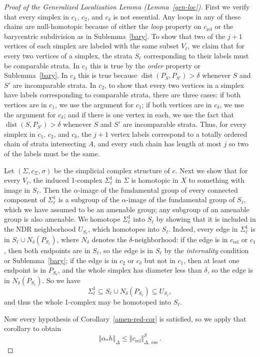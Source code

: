 \documentclass[psamsfonts]{amsart}
\theoremstyle{remark}
\DeclareMathOperator{\dist}{dist}
\DeclareMathOperator{\ess}{ess}
\DeclareMathOperator{\rel}{rel}
\begin{document}
\begin{proof}[Proof of the Generalized Localization Lemma (Lemma~\ref{gen-loc})]
First we verify that every simplex in $c_1$, $c_2$, and $c_\delta$ is not essential.  Any loops in any of these chains are null-homotopic because of either the \emph{loop} property on $c_{\rel}$ or the barycentric subdivision as in Sublemma~\ref{bary}.  To show that two of the $j+1$ vertices of each simplex are labeled with the same subset $V_\ell$, we claim that for every two vertices of a simplex, the strata $S_\ell$ corresponding to their labels must be comparable strata.  In $c_1$ this is true by the \emph{order} property or Sublemma~\ref{bary}.  In $c_\delta$ this is true because $\dist(P_S, P_{S'}) > \delta$ whenever $S$ and $S'$ are incomparable strata.  In $c_2$, to show that every two vertices in a simplex have labels corresponding to comparable strata, there are three cases: if both vertices are in $c_1$, we use the argument for $c_1$; if both vertices are in $c_\delta$, we use the argument for $c_\delta$; and if there is one vertex in each, we use the fact that $\dist(S, P_{S'}) > \delta$ whenever $S$ and $S'$ are incomparable strata.  Thus, for every simplex in $c_1$, $c_2$, and $c_\delta$, the $j+1$ vertex labels correspond to a totally ordered chain of strata intersecting $A$, and every such chain has length at most $j$ so two of the labels must be the same.

Let $(\Sigma, c_\Sigma, \sigma)$ be the simplicial complex structure of $c$.  Next we show that for every $V_\ell$, the induced 1-complex $\Sigma_\ell^1$ in $\Sigma$ is homotopic in $X$ to something with image in $S_\ell$.  Then the $\alpha$-image of the fundamental group of every connected component of $\Sigma_\ell^1$ is a subgroup of the $\alpha$-image of the fundamental group of $S_\ell$, which we have assumed to be an amenable group; any subgroup of an amenable group is also amenable.  We homotope $\Sigma_\ell^1$ into $S_\ell$ by showing that it is included in the NDR neighborhood $U_{S_\ell}$, which homotopes into $S_\ell$.  Indeed, every edge in $\Sigma_\ell^1$ is in $S_\ell \cup N_{\delta}(P_{S_\ell})$, where $N_\delta$ denotes the $\delta$-neighborhood: if the edge is in $c_{\rel}$ or $c_1$, then both endpoints are in $S_\ell$, so the edge is in $S_\ell$ by the \emph{internality} condition or Sublemma~\ref{bary}; if the edge is in $c_2$ or $c_{\delta}$ but not in $c_1$, then at least one endpoint is in $P_{S_{\ell}}$, and the whole simplex has diameter less than $\delta$, so the edge is in $N_\delta(P_{S_\ell})$.  So we have 
\[\Sigma_\ell^1 \subseteq S_\ell \cup N_{\delta}(P_{S_\ell}) \subseteq U_{S_\ell},\]
and thus the whole 1-complex may be homotoped into $S_\ell$.

Now every hypothesis of Corollary~\ref{amen-red-cor} is satisfied, so we apply that corollary to obtain
\[\Vert \alpha_*h \Vert_\Delta \leq \Vert c_{\rel} \Vert_{\Delta, \ess}^{\mathcal{S}}.\]
\end{proof}
\end{document}
